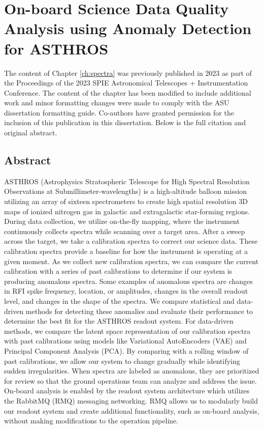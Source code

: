 \section{On-board Science Data Quality Analysis using Anomaly Detection for ASTHROS}
The content of Chapter \ref{ch:spectra} was previously published in 2023 as part of the Proceedings of the 2023 SPIE Astronomical Telescopes + Instrumentation Conference.
The content of the chapter has been modified to include additional work and minor formatting changes were made to comply with the ASU dissertation formatting guide.
Co-authors have granted permission for the inclusion of this publication in this dissertation. 
Below is the full citation and original abstract.
\begin{refsection}
  \nocite{horton2024board}
  \printbibliography[heading=none]
\end{refsection}
\subsection{Abstract}
ASTHROS (Astrophysics Stratospheric Telescope for High Spectral Resolution Observations at Submillimeter-wavelengths) is a high-altitude balloon mission utilizing an array of sixteen spectrometers to create high spatial resolution 3D maps of ionized nitrogen gas in galactic and extragalactic star-forming regions. During data collection, we utilize on-the-fly mapping, where the instrument continuously collects spectra while scanning over a target area. After a sweep across the target, we take a calibration spectra to correct our science data. These calibration spectra provide a baseline for how the instrument is operating at a given moment. As we collect new calibration spectra, we can compare the current calibration with a series of past calibrations to determine if our system is producing anomalous spectra. Some examples of anomalous spectra are changes in RFI spike frequency, location, or amplitudes, changes in the overall readout level, and changes in the shape of the spectra. We compare statistical and data-driven methods for detecting these anomalies and evaluate their performance to determine the best fit for the ASTHROS readout system. For data-driven methods, we compare the latent space representation of our calibration spectra with past calibrations using models like Variational AutoEncoders (VAE) and Principal Component Analysis (PCA). By comparing with a rolling window of past calibrations, we allow our system to change gradually while identifying sudden irregularities. When spectra are labeled as anomalous, they are prioritized for review so that the ground operations team can analyze and address the issue. On-board analysis is enabled by the readout system architecture which utilizes the RabbitMQ (RMQ) messaging networking. RMQ allows us to modularly build our readout system and create additional functionality, such as on-board analysis, without making modifications to the operation pipeline.
